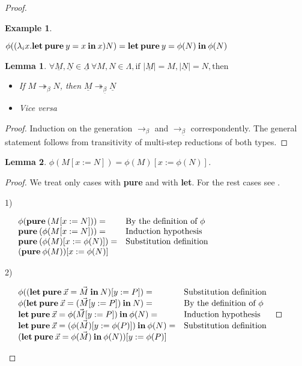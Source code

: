 \documentclass[a4paper]{article}
\newtheorem{lemma}{Lemma}
\newtheorem{ex}{Example}
\begin{document}
\begin{proof}
\begin{ex}
  $ $

  $\phi((\lambda_i x. {\bf let \: pure \:} y = x {\: \bf in \:} x) N) = {\bf let \: pure \:} y = \phi(N) {\: \bf in \:} \phi(N)$
\end{ex}

\begin{lemma}

  $\forall \underline{M}, \underline{N} \in \underline{\Lambda} \: \forall M, N \in \Lambda, \text{if } |\underline{M}| = M, |\underline{N}| = N, \text{then}$
  \begin{itemize}
    \item If $M \twoheadrightarrow_{\beta} N$, then $\underline{M} \twoheadrightarrow_{\underline{\beta}} \underline{N}$
    \item Vice versa
  \end{itemize}
\end{lemma}

\begin{proof}

  Induction on the generation $\rightarrow_{\beta}$ and $\rightarrow_{\underline{\beta}}$ correspondently. The general statement follows from transitivity
  of multi-step reductions of both types.
\end{proof}

\begin{lemma}
  $\phi(M [x := N]) = \phi(M) [x := \phi(N)]$.
\end{lemma}

\begin{proof}
  We treat only cases with {\bf pure} and with {\bf let}. For the rest cases see \cite{Baren}.

  1)
  $ $

  $\begin{array}{lll}
  & \phi({\bf pure \:} (M [x := N])) = & \text{By the definition of $\phi$}\\
  & {\bf pure \:} (\phi(M [x := N])) = & \text{Induction hypothesis} \\
  & {\bf pure \:} (\phi(M) [x := \phi(N)]) = & \text{Substitution definition}\\
  & ({\bf pure \:} \phi (M)) [x := \phi(N)]&
  \end{array}$

  2)
  $ $

  $\begin{array}{lll}
  &\phi(({\bf let \: pure \:} \vec{x} = \vec{M} {\: \bf in \:} N) [y := P]) = & \text{Substitution definition}\\
  &\phi({\bf let \: pure \:} \vec{x} = (\vec{M}[y := P]) {\: \bf in \:} N) = & \text{By the definition of $\phi$}\\
  &{\bf let \: pure \:} \vec{x} = \phi(\vec{M}[y := P]) {\: \bf in \:} \phi(N) = & \text{Induction hypothesis} \\
  &{\bf let \: pure \:} \vec{x} = (\phi(\vec{M}) [y := \phi(P)]) {\: \bf in \:} \phi(N) =& \text{Substitution definition} \\
  &({\bf let \: pure \:} \vec{x} = \phi(\vec{M}) {\: \bf in \:} \phi(N))[y := \phi(P)]
  \end{array}$


\end{proof}
\end{proof}
\end{document}
